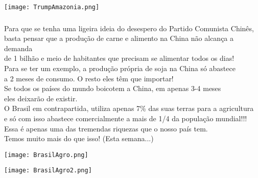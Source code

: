 \documentclass[aspectratio=169]{beamer}
\begin{document}
	\begin{frame}
	  \texttt{[image: TrumpAmazonia.png]}
	\end{frame}



\begin{frame}
	  \frametitle{}
	  \framesubtitle{}
	    \centering
	  	Para que se tenha uma ligeira ideia do desespero do Partido Comunista Chinês,\\
	  	basta pensar que a produção de carne e alimento na China não alcança a demanda\\
	  	de 1 bilhão e meio de habitantes que precisam se alimentar todos os dias! \\
	  		\vspace{.5cm}
	  	Para se ter um exemplo, a produção própria de soja na China só abastece\\
	  	a 2 meses de consumo. O resto eles têm que importar! \\
	  	Se todos os países do mundo boicotem a China, em apenas 3-4 meses\\
	  	eles deixarão de  existir.\\
	  		\vspace{.5cm}
		O Brasil em contrapartida, utiliza apenas 7\% das suas terras para a agricultura\\
		e só com isso abastece comercialmente a mais de 1/4 da população mundial!!! \\
	Essa é apenas uma das tremendas riquezas que o nosso país tem. \\
	Temos muito mais do que isso! (Esta semana...)\\
	\end{frame}
	
	\begin{frame}
	  \texttt{[image: BrasilAgro.png]}
	\end{frame}

	\begin{frame}
	  \texttt{[image: BrasilAgro2.png]}
	\end{frame}
\end{document}
